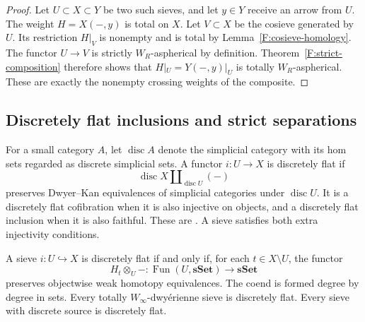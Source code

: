 \begin{proof}
Let $U\subset X\subset Y$ be two such sieves,
and let $y\in Y$ receive an arrow from $U$.
The weight $H=X(-,y)$ is total on $X$.
Let $V\subset X$ be the cosieve generated by $U$.
Its restriction $H|_V$ is nonempty and is total
by Lemma~\ref{F:cosieve-homology}. The functor
$U\to V$ is strictly $W_R$-aspherical by
definition. Theorem~\ref{F:strict-composition}
therefore shows that $H|_U=Y(-,y)|_U$ is
totally $W_R$-aspherical. These are exactly
the nonempty crossing weights of the composite.
\end{proof}

\subsection{Discretely flat inclusions and strict separations}

\begin{definition}\label{F:DFdefinition}
For a small category $A$, let $\operatorname{disc}A$ denote the
simplicial category with its hom sets regarded as discrete
simplicial sets. A functor $i:U\to X$ is discretely flat if
\[
 \operatorname{disc}X\amalg_{\operatorname{disc}U}(-)
\]
preserves Dwyer--Kan equivalences of simplicial categories under
$\operatorname{disc}U$. It is a discretely flat cofibration when
it is also injective on objects, and a discretely flat inclusion
when it is also faithful. These are
\citet[Definition~3.4]{F_HORR2024}. A sieve satisfies both extra
injectivity conditions.
\end{definition}

\begin{proposition}
\label{F:weight-test}
A sieve $i:U\hookrightarrow X$ is discretely flat if and only if,
for each $t\in X\setminus U$, the functor
\[
 H_t\otimes_U-:\operatorname{Fun}(U,\mathbf{sSet})
       \longrightarrow\mathbf{sSet}
\]
preserves objectwise weak homotopy equivalences. The coend is formed
degree by degree in sets. Every totally $W_\infty$-dwy\'erienne
sieve is discretely flat. Every sieve with discrete source is
discretely flat.
\end{proposition}

